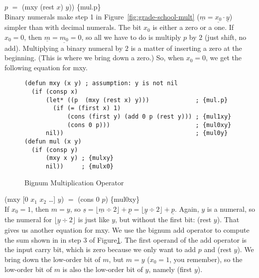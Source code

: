 \hspace*{2cm} $p$ $=$ \textsf{(mxy (rest $x$) $y$))} \hfill \{mul.p\}
\\

Binary numerals make step 1 in Figure~\ref{fig:grade-school-mult}
($\underline{m} = \underline{x_0} \cdot \underline{y}$)
simpler than with decimal numerals.
The bit $x_0$ is either a zero or a one.
If $x_0 = 0$, then $\underline{m} = \underline{m_0} = 0$, so all
we have to do is multiply $p$ by $2$ (just shift, no add).
Multiplying a binary numeral by $2$ is a matter
of inserting a zero at the beginning.
(This is where we bring down a zero.)
So, when $x_0 = 0$, we get the following equation for \textsf{mxy}.

\begin{figure}
\begin{Verbatim}
(defun mxy (x y) ; assumption: y is not nil
  (if (consp x)
      (let* ((p  (mxy (rest x) y)))             ; {mul.p}
        (if (= (first x) 1)
            (cons (first y) (add 0 p (rest y))) ; {mul1xy}
            (cons 0 p)))                        ; {mul0xy}
      nil))                                     ; {mul0y}
(defun mul (x y)
  (if (consp y)
      (mxy x y) ; {mulxy}
      nil))     ; {mulx0}
\end{Verbatim}
\label{bignum-mul-defun}
\caption{Bignum Multiplication Operator}
\label{fig:bignum-mul-defun}
\end{figure}

\hspace*{2cm} \textsf{(mxy [$0$ $x_1$ $x_2$ \dots] $y$)} $=$ \textsf{(cons $0$ $p$)} \hfill \{mul0xy\}
\\

If $x_0 = 1$, then $m = y$,
so $\underline{s} = \lfloor \underline{m}\div 2\rfloor + \underline{p} = \lfloor \underline{y}\div 2\rfloor + \underline{p}$.
Again, $y$ is a numeral, so the numeral for $\lfloor \underline{y}\div 2\rfloor$
is just like $y$, but without the first bit: (rest $y$).
That gives us another equation for \textsf{mxy}.
We use the bignum add operator to compute the sum 
shown in in step 3 of Figure\ref{fig:bignum-mul-defun}.
The first operand of the \textsf{add} operator is the input carry bit,
which is zero because we only want to add $p$ and \textsf{(rest $y$)}.
We bring down the low-order bit of $m$, but $m = y$
($x_0 = 1$, you remember), so the low-order bit of $m$
is also the low-order bit of $y$, namely \textsf{(first $y$)}.

